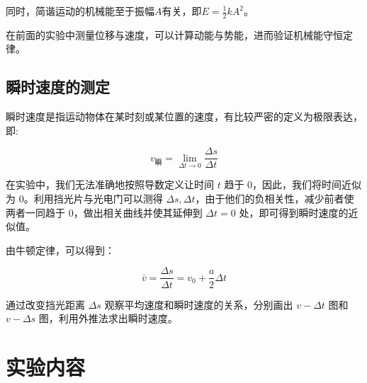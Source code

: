 \documentclass[11pt]{article}
\begin{document}
同时，简谐运动的机械能至于振幅$A$有关，即$E = \frac{1}{2} kA^2$。

在前面的实验中测量位移与速度，可以计算动能与势能，进而验证机械能守恒定律。

\subsection{瞬时速度的测定}

瞬时速度是指运动物体在某时刻或某位置的速度，有比较严密的定义为极限表达，即:

\[v_{\text{瞬}} = \lim_{\Delta t \to 0} \frac{\Delta s}{\Delta t}\]

在实验中，我们无法准确地按照导数定义让时间 $t$ 趋于 0，因此，我们将时间近似为 0。利用挡光片与光电门可以测得 $\Delta s,\Delta t$，由于他们的负相关性，减少前者使两者一同趋于 0，做出相关曲线并使其延伸到 $\Delta t = 0$ 处，即可得到瞬时速度的近似值。

由牛顿定律，可以得到：

\[\bar{v} = \frac{\Delta s}{\Delta t} = v_0 + \frac{a}{2} \Delta t\]

通过改变挡光距离 $\Delta s$ 观察平均速度和瞬时速度的关系，分别画出 $v-\Delta t$ 图和 $v-\Delta s$ 图，利用外推法求出瞬时速度。

\section{实验内容}
\end{document}
